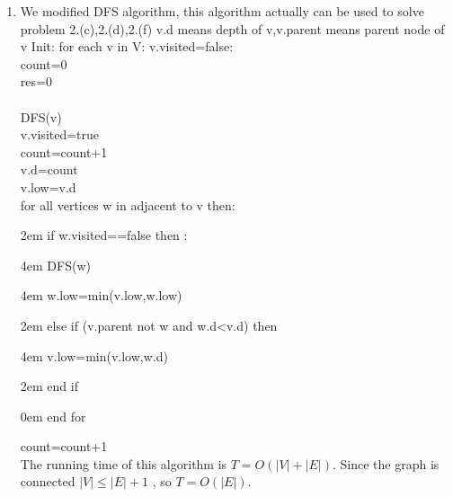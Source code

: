 \documentclass[paper=a4, fontsize=11pt]{scrartcl} %
\numberwithin{equation}{section} %
\numberwithin{figure}{section} %
\numberwithin{table}{section} %
\begin{document}
\begin{enumerate}[label={2.(\alph*)}]
  \item

We modified DFS algorithm, this algorithm actually can be used to solve problem 2.(c),2.(d),2.(f)
v.d means depth of v,v.parent means parent node of v
Init: for each v in V: v.visited=false:\\
count=0\\
res=0\\
\\
DFS(v)\\
	v.visited=true\\
	count=count+1\\
	v.d=count\\
	v.low=v.d\\
	for all vertices w in adjacent to v then: \par
		\setlength{\parindent} {2em} if w.visited==false then :\par
			\setlength{\parindent} {4em} DFS(w)\par
			\setlength{\parindent} {4em} w.low=min(v.low,w.low) \par
		\setlength{\parindent} {2em} else if (v.parent not w and w.d<v.d) then \par
			\setlength{\parindent} {4em} v.low=min(v.low,w.d) \par
		\setlength{\parindent} {2em} end if  \par
\setlength{\parindent} {0em} end for \par
count=count+1\\
The running time of this algorithm is $T = O(|V | + |E|)$. Since the graph is connected ${ |V | \leq |E| + 1 }$ , so $T = O(|E|)$.


\end{enumerate}
\end{document}
